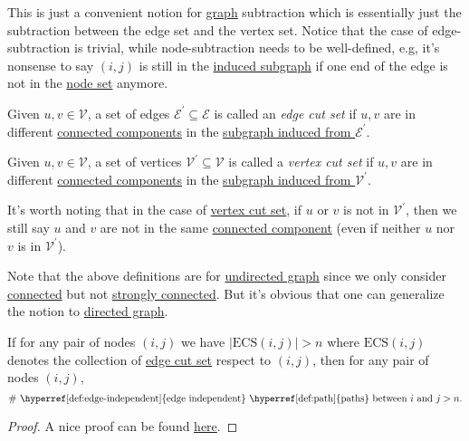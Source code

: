 \begin{intuition}
	This is just a convenient notion for \hyperref[def:graph]{graph} subtraction which is essentially just the subtraction between the edge set and the vertex set. Notice that the case of edge-subtraction is trivial, while node-subtraction needs to be well-defined, e.g, it's nonsense to say \((i, j)\) is still in the \hyperref[def:induced-subgraph]{induced subgraph} if one end of the edge is not in the \hyperref[def:vertex-set]{node set} anymore.
\end{intuition}

\begin{definition}\label{def:edge-cut-set}
	Given \(u, v\in \mathcal{V} \), a set of edges \(\mathcal{E} ^\prime \subseteq \mathcal{E} \) is called an \emph{edge cut set} if \(u, v\) are in different \hyperref[def:connected]{connected components} in the \hyperref[def:induced-subgraph]{subgraph induced from \(\mathcal{E} ^\prime \)}.
\end{definition}

\begin{definition}\label{def:vertex-cut-set}
	Given \(u, v\in \mathcal{V} \), a set of vertices \(\mathcal{V} ^\prime \subseteq \mathcal{V}\) is called a \emph{vertex cut set} if \(u, v\) are in different \hyperref[def:connected]{connected components} in the \hyperref[def:induced-subgraph]{subgraph induced from \(\mathcal{V} ^\prime \)}.
\end{definition}

\begin{note}
	It's worth noting that in the case of \hyperref[def:vertex-cut-set]{vertex cut set}, if \(u\) or \(v\) is not in \(\mathcal{V} ^\prime\), then we still say \(u\) and \(v\) are not in the same \hyperref[def:connected]{connected component} (even if neither \(u\) nor \(v\) is in \(\mathcal{V} ^\prime \)).
\end{note}

\begin{remark}
	Note that the above definitions are for \hyperref[def:undirected-graph]{undirected graph} since we only consider \hyperref[def:connected]{connected} but not \hyperref[def:strongly-connected]{strongly connected}. But it's obvious that one can generalize the notion to \hyperref[def:directed-graph]{directed graph}.
\end{remark}


\begin{theorem}\label{thm:Mengur-theorem}
	If for any pair of nodes \((i, j)\) we have \(\left\vert \mathrm{ECS}(i, j) \right\vert > n\) where \(\mathrm{ECS} (i, j)\) denotes the collection of \hyperref[def:edge-cut-set]{edge cut set} respect to \((i, j)\), then for any pair of nodes \((i, j)\),
	\[
		\# \text{ \hyperref[def:edge-independent]{edge independent} \hyperref[def:path]{paths} between } i \text{ and } j > n.
	\]
\end{theorem}
\begin{proof}
	A nice proof can be found \href{https://en.wikipedia.org/wiki/Menger%27s_theorem}{here}.
\end{proof}